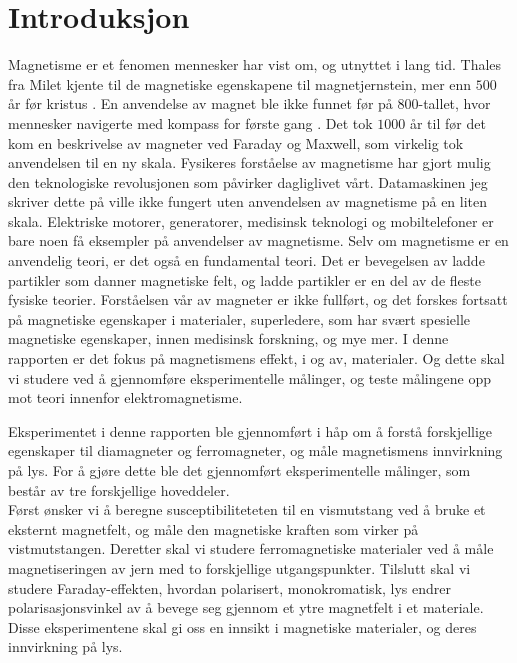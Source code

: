\documentclass[%
 reprint,
nofootinbib,
aps,
]{revtex4-1}
\begin{document}

\section{Introduksjon}
Magnetisme er et fenomen mennesker har vist om, og utnyttet i lang tid. Thales fra Milet kjente til de magnetiske egenskapene til magnetjernstein, mer enn $500$ år før kristus \cite{holtebekk_magnetisme_2017}. En anvendelse av magnet ble ikke funnet før på $800$-tallet, hvor mennesker navigerte med kompass for første gang \cite{holtebekk_magnetisme_2017}. Det tok $1000$ år til før det kom en beskrivelse av magneter ved Faraday og Maxwell, som virkelig tok anvendelsen til en ny skala. Fysikeres forståelse av magnetisme har gjort mulig den teknologiske revolusjonen som påvirker dagliglivet vårt. Datamaskinen jeg skriver dette på ville ikke fungert uten anvendelsen av magnetisme på en liten skala. Elektriske motorer, generatorer, medisinsk teknologi og mobiltelefoner er bare noen få eksempler på anvendelser av magnetisme. Selv om magnetisme er en anvendelig teori, er det også en fundamental teori. Det er bevegelsen av ladde partikler som danner magnetiske felt, og ladde partikler er en del av de fleste fysiske teorier. Forståelsen vår av magneter er ikke fullført, og det forskes fortsatt på magnetiske egenskaper i materialer, superledere, som har svært spesielle magnetiske egenskaper, innen medisinsk forskning, og mye mer.
I denne rapporten er det fokus på magnetismens effekt, i og av, materialer. Og dette skal vi studere ved å gjennomføre eksperimentelle målinger, og teste målingene opp mot teori innenfor elektromagnetisme.\par
Eksperimentet i denne rapporten ble gjennomført i håp om å forstå forskjellige egenskaper til diamagneter og ferromagneter, og måle magnetismens innvirkning på lys. For å gjøre dette ble det gjennomført eksperimentelle målinger, som består av tre forskjellige hoveddeler.\\
Først ønsker vi å beregne susceptibiliteteten til en vismutstang ved å bruke et eksternt magnetfelt, og måle den magnetiske kraften som virker på vistmutstangen. Deretter skal vi studere ferromagnetiske materialer ved å måle magnetiseringen av jern med to forskjellige utgangspunkter. Tilslutt skal vi studere Faraday-effekten, hvordan polarisert, monokromatisk, lys endrer polarisasjonsvinkel av å bevege seg gjennom et ytre magnetfelt i et materiale. Disse eksperimentene skal gi oss en innsikt i magnetiske materialer, og deres innvirkning på lys.
\end{document}
